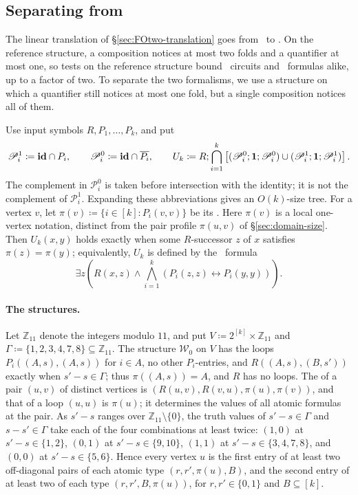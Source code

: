 \subsection{Separating \texorpdfstring{{\boldmath\CoR}}{CoR} from
 \texorpdfstring{{\boldmath\FOtwo}}{FO2}}\label{sec:reverse}
The linear translation of \S\ref{sec:FOtwo-translation} goes from \FOtwo\ to \CoR. On the reference
structure, a composition notices at most two folds and a quantifier at
most one, so tests on the reference structure bound \CoR\ circuits and
\FOtwo\ formulas alike, up to a factor of two. To separate the two
formalisms, we use a structure on which a quantifier still notices at
most one fold, but a single composition notices all of them.

Use input symbols $R,P_1,\ldots,P_k$, and put
\[
 \mathscr P_i^1\coloneqq\mathbf{id}\cap P_i,\qquad \mathscr P_i^0\coloneqq\mathbf{id}\cap\overline{P_i},\qquad
 U_k\coloneqq R;\bigcap_{i=1}^k
 \left[(\mathscr P_i^0;\mathbf{1};\mathscr P_i^0)\cup(\mathscr P_i^1;\mathbf{1};\mathscr P_i^1)\right].
\]
The complement in $\mathscr P_i^0$ is taken before intersection with the identity;
it is not the complement of $\mathscr P_i^1$. Expanding these abbreviations gives
an $O(k)$-size tree. For a vertex $v$, let
$\pi(v)\coloneqq\{i\in[k]:P_i(v,v)\}$ be its .
Here $\pi(v)$ is a local one-vertex notation, distinct from the pair
profile $\pi(u,v)$ of \S\ref{sec:domain-size}.
Then $U_k(x,y)$ holds exactly when some $R$-successor $z$ of $x$
satisfies $\pi(z)=\pi(y)$; equivalently, $U_k$ is defined by the
\FOthree\ formula
\[
 \exists z\left(R(x,z)\land
     \bigwedge_{i=1}^k(P_i(z,z)\leftrightarrow P_i(y,y))\right).
\]

\paragraph{The structures.}
Let $\mathbb Z_{11}$ denote the integers modulo $11$, and put
$V\coloneqq2^{[k]}\times\mathbb Z_{11}$ and
$\Gamma\coloneqq\{1,2,3,4,7,8\}\subseteq\mathbb Z_{11}$. The structure
$\mathcal W_0$ on $V$ has the loops $P_i((A,s),(A,s))$ for $i\in A$, no
other $P_i$-entries, and $R((A,s),(B,s'))$ exactly when $s'-s\in\Gamma$;
thus $\pi((A,s))=A$, and $R$ has no loops. The  of a pair
$(u,v)$ of distinct vertices is $(R(u,v),R(v,u),\pi(u),\pi(v))$, and that
of a loop $(u,u)$ is $\pi(u)$; it determines the values of all atomic
formulas at the pair. As $s'-s$ ranges over
$\mathbb Z_{11}\setminus\{0\}$, the truth values of $s'-s\in\Gamma$ and
$s-s'\in\Gamma$ take each of the four combinations at least twice:
$(1,0)$ at $s'-s\in\{1,2\}$, $(0,1)$ at $s'-s\in\{9,10\}$, $(1,1)$ at
$s'-s\in\{3,4,7,8\}$, and $(0,0)$ at $s'-s\in\{5,6\}$. Hence every
vertex $u$ is the first entry of at least two off-diagonal pairs of each
atomic type $(r,r',\pi(u),B)$, and the second entry of at least two
of each type $(r,r',B,\pi(u))$, for $r,r'\in\{0,1\}$ and $B\subseteq[k]$.

